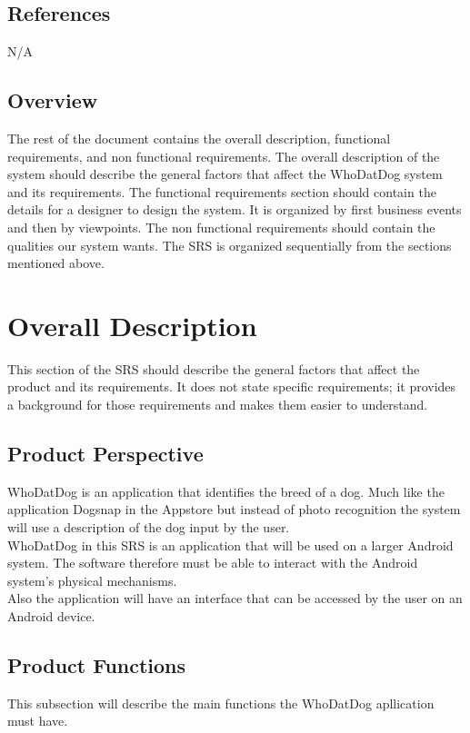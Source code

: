 \documentclass[]{article}
\begin{document}

\subsection{References}
N/A

\subsection{Overview}
\label{sub:overview}
The rest of the document contains the overall description, functional requirements, and non functional requirements. The overall description of the system should describe the general factors that affect the WhoDatDog system and its requirements. The functional requirements section should contain the details for a designer to design the system. It is organized by first business events and then by viewpoints. The non functional requirements should contain the qualities our system wants. The SRS is organized sequentially from the sections mentioned above. 
\section{Overall Description}
\label{sec:overall_description}

This section of the SRS should describe the general factors that affect the product and its requirements. It does not state specific requirements; it provides a background for those requirements and makes them easier to understand.

\subsection{Product Perspective}
\label{sub:product_perspective}
WhoDatDog is an application that identifies the breed of a dog. Much like the application Dogsnap in the Appstore but instead of photo recognition the system will use a description of the dog input by the user.\\

WhoDatDog in this SRS is an application that will be used on a larger Android system. The software therefore must be able to interact with the Android system's physical mechanisms.\\

Also the application will have an interface that can be accessed by the user on an Android device.

\subsection{Product Functions}
\label{sub:product_functions}
This subsection will describe the main functions the WhoDatDog apllication must have.
\end{document}
